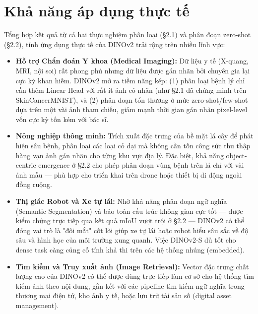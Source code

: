 \section{Khả năng áp dụng thực tế}
Tổng hợp kết quả từ cả hai thực nghiệm phân loại (§2.1) và phân đoạn zero-shot (§2.2), tính ứng dụng thực tế của DINOv2 trải rộng trên nhiều lĩnh vực:
\begin{itemize}
    \item \textbf{Hỗ trợ Chẩn đoán Y khoa (Medical Imaging):} Dữ liệu y tế (X-quang, MRI, nội soi) rất phong phú nhưng dữ liệu được gán nhãn bởi chuyên gia lại cực kỳ khan hiếm. DINOv2 mở ra tiềm năng kép: (1) phân loại bệnh lý chỉ cần thêm Linear Head với rất ít ảnh có nhãn (như §2.1 đã chứng minh trên SkinCancerMNIST), và (2) phân đoạn tổn thương ở mức zero-shot/few-shot dựa trên một vài ảnh tham chiếu, giảm mạnh thời gian gán nhãn pixel-level vốn cực kỳ tốn kém với bác sĩ.
    \item \textbf{Nông nghiệp thông minh:} Trích xuất đặc trưng của bề mặt lá cây để phát hiện sâu bệnh, phân loại các loại cỏ dại mà không cần tốn công sức thu thập hàng vạn ảnh gán nhãn cho từng khu vực địa lý. Đặc biệt, khả năng object-centric emergence ở §2.2 cho phép phân đoạn vùng bệnh trên lá chỉ với vài ảnh mẫu — phù hợp cho triển khai trên drone hoặc thiết bị di động ngoài đồng ruộng.
    \item \textbf{Thị giác Robot và Xe tự lái:} Nhờ khả năng phân đoạn ngữ nghĩa (Semantic Segmentation) và bảo toàn cấu trúc không gian cực tốt — được kiểm chứng trực tiếp qua kết quả mIoU vượt trội ở §2.2 — DINOv2 có thể đóng vai trò là "đôi mắt" cốt lõi giúp xe tự lái hoặc robot hiểu sâu sắc về độ sâu và hình học của môi trường xung quanh. Việc DINOv2-S đủ tốt cho dense task càng củng cố tính khả thi trên các hệ thống nhúng (embedded).
    \item \textbf{Tìm kiếm và Truy xuất ảnh (Image Retrieval):} Vector đặc trưng chất lượng cao của DINOv2 có thể được dùng trực tiếp làm cơ sở cho hệ thống tìm kiếm ảnh theo nội dung, gắn kết với các pipeline tìm kiếm ngữ nghĩa trong thương mại điện tử, kho ảnh y tế, hoặc lưu trữ tài sản số (digital asset management).
\end{itemize}
